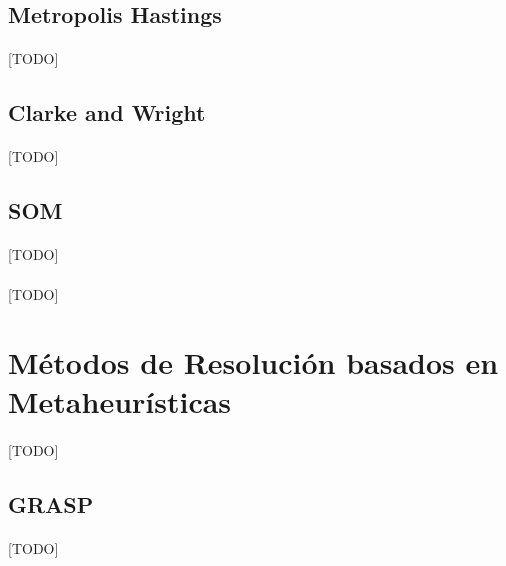 \documentclass{subfiles}
\begin{document}
      \subsection{Metropolis Hastings}
      \label{sec:solving_metropolis}

        \paragraph{}
        [TODO]

      \subsection{Clarke and Wright}
      \label{sec:solving_clarke_and_wright}

        \paragraph{}
        [TODO]

      \subsection{SOM}
      \label{sec:solving_som}

        \paragraph{}
        [TODO]

      \paragraph{}
      [TODO]

    \section{Métodos de Resolución basados en Metaheurísticas}
    \label{sec:solving_metaheuristics}

      \paragraph{}
      [TODO]

      \subsection{GRASP}
      \label{sec:solving_grasp}

        \paragraph{}
        [TODO]
\end{document}
